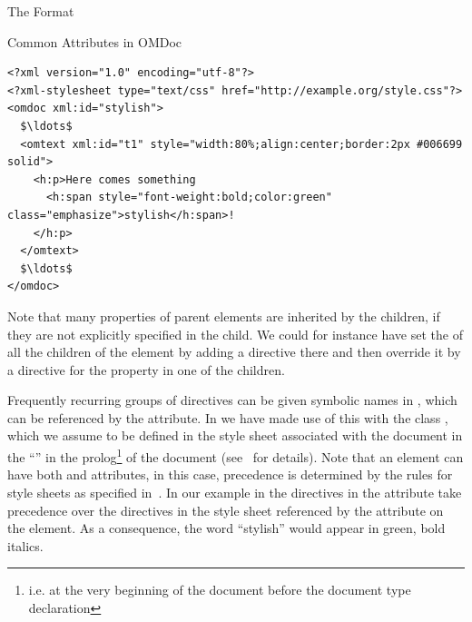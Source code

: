 \begin{omgroup}[creators=miko,id=spec-intro]{The \omdoc Format}
\begin{omgroup}[id=common-attribs]{Common Attributes in OMDoc}
\begin{lstlisting}[label=lst:css-basic,mathescape,
   caption={Basic {\css} Directives in a {\attributeshort{style}} Attribute},
   index={style,class}]
<?xml version="1.0" encoding="utf-8"?>
<?xml-stylesheet type="text/css" href="http://example.org/style.css"?>
<omdoc xml:id="stylish">
  $\ldots$
  <omtext xml:id="t1" style="width:80%;align:center;border:2px #006699 solid">
    <h:p>Here comes something 
      <h:span style="font-weight:bold;color:green" class="emphasize">stylish</h:span>!
    </h:p>
  </omtext>
  $\ldots$
</omdoc>
\end{lstlisting}

Note that many {\css} properties of parent elements are inherited by the children,
if they are not explicitly specified in the child. We could for instance have set
the {} of all the children of the  element
by adding a directive {} there and then override it by
a directive for the property {} in one of the children.

Frequently recurring groups of {\css} directives can be given symbolic names in {\css}
, which can be referenced by the
{} attribute. In {} we have made use of this
with the class {}, which we assume to be defined in the style sheet
{} associated with the document in the ``{}'' in the prolog\footnote{i.e. at the very beginning of
  the {\xml} document before the document type declaration} of the {\xml} document
(see~\cite{Clark:assxd99} for details).  Note that an \omdoc element can have both
{} and {} attributes, in this case, precedence
is determined by the rules for {\css} style sheets as specified in~\cite{BosHak:css98}. In
our example in {} the directives in the {}
attribute take precedence over the {\css} directives in the style sheet referenced by the
{} attribute on the  element. As a consequence,
the word ``stylish'' would appear in green, bold italics.
\end{omgroup}
\end{omgroup}



